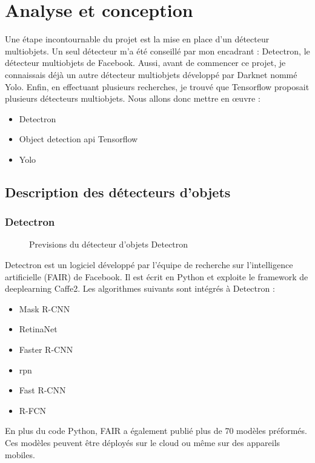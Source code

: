 \documentclass[debug,nodate,hideweeklyreports]{polytech/polytech}
\begin{document}
\chapter{Analyse et conception}

Une étape incontournable du projet est la mise en place d’un détecteur multiobjets.
Un seul détecteur m’a été conseillé par mon encadrant : Detectron, le détecteur multiobjets de Facebook. Aussi, avant de commencer ce projet, je connaissais déjà un autre détecteur multiobjets développé par Darknet nommé Yolo. Enfin, en effectuant plusieurs recherches, je trouvé que Tensorflow proposait plusieurs détecteurs multiobjets. 
Nous allons donc mettre en œuvre :

\begin{itemize}
\item Detectron
\item Object detection \gls{api} Tensorflow
\item Yolo
\end{itemize}

\section{Description des détecteurs d'objets}

\subsection{Detectron}

\begin{figure}
  \caption{Previsions du détecteur d'objets Detectron}
  \label{fig:imgdetectron}
\end{figure}

Detectron est un logiciel développé par l’équipe de recherche sur l’intelligence artificielle (FAIR) de Facebook. Il est écrit en Python et exploite le \gls{framework} de \gls{deeplearning} Caffe2.
Les algorithmes suivants sont intégrés à Detectron :
\begin{itemize}
\item Mask R-CNN
\item RetinaNet
\item Faster R-CNN
\item \gls{rpn}
\item Fast R-CNN
\item R-FCN
\end{itemize}
En plus du code Python, FAIR a également publié plus de 70 modèles préformés. Ces modèles peuvent être déployés sur le cloud ou même sur des appareils mobiles.
\end{document}
